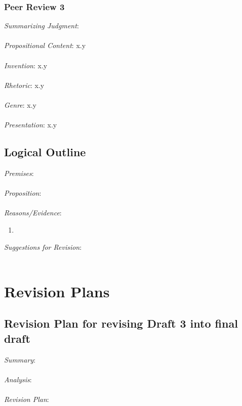 \documentclass[12pt]{article}
\begin{document}
\subsubsection*{Peer Review 3}
\noindent \textit{Summarizing Judgment}: \\ \\
\textit{Propositional Content}: x.y \\ \\ %
\textit{Invention}: x.y \\ \\
\textit{Rhetoric}: x.y \\ \\
\textit{Genre}: x.y \\ \\
\textit{Presentation}: x.y
\subsection*{Logical Outline}
\noindent \textit{Premises}: \\ \\
\textit{Proposition}: \\ \\
\textit{Reasons/Evidence}:
\begin{enumerate}
	\item \ %
\end{enumerate}
\textit{Suggestions for Revision}: \\\\





















\newpage
\section{Revision Plans}
\subsection*{Revision Plan for revising Draft 3 into final draft}
\noindent \textit{Summary}: \\ \\
\textit{Analysis}: \\ \\
\textit{Revision Plan}: 
\end{document}
